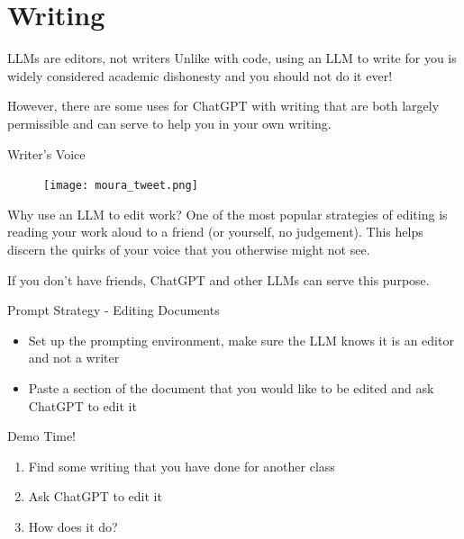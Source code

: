 \documentclass[
	11pt, %
	aspectratio=169, %
]{beamer}
\begin{document}
\section{Writing}
\begin{frame}{LLMs are editors, not writers}
    Unlike with code, using an LLM to write for you is widely considered \alert{academic dishonesty} and you should not do it ever!

    \vspace{20pt}
    However, there are some uses for ChatGPT with writing that are both largely permissible and can serve to help you in your own writing.
\end{frame}
\begin{frame}{Writer's Voice}
    \begin{figure}
        \centering
        \texttt{[image: moura\_tweet.png]}
        \label{Writer's Voice}
    \end{figure}
\end{frame}
\begin{frame}{Why use an LLM to edit work?}
    One of the most popular strategies of editing is reading your work aloud to a friend (or yourself, no judgement). 
    This helps discern the quirks of your \alert{voice} that you otherwise might not see.

    \bigbreak
    If you don't have friends, ChatGPT and other LLMs can serve this purpose.
\end{frame}
\begin{frame}{Prompt Strategy - Editing Documents}
    \begin{itemize}
        \item Set up the \alert{prompting environment}, make sure the LLM knows it is an editor and not a writer
        \item Paste a section of the document that you would like to be edited and ask ChatGPT to edit it
    \end{itemize}
\end{frame}
\begin{frame}
    \begin{center}
        \huge{Demo Time!}
    \end{center}
    \begin{enumerate}
        \item Find some writing that you have done for another class
        \item Ask ChatGPT to edit it
        \item How does it do?
    \end{enumerate}
\end{frame}
\end{document}
